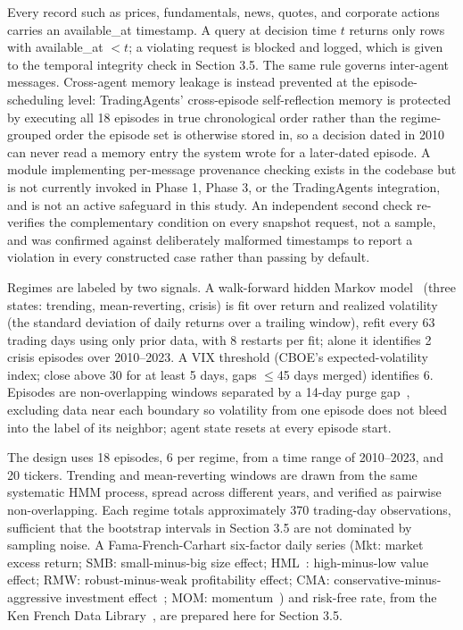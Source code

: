 \documentclass{article}
\begin{document}
Every record such as prices, fundamentals, news, quotes, and corporate actions carries an available\_at timestamp. A query at decision time $t$ returns only rows with available\_at $< t$; a violating request is blocked and logged, which is given to the temporal integrity check in Section 3.5. The same rule governs inter-agent messages. Cross-agent memory leakage is instead prevented at the episode-scheduling level: TradingAgents' cross-episode self-reflection memory is protected by executing all 18 episodes in true chronological order rather than the regime-grouped order the episode set is otherwise stored in, so a decision dated in 2010 can never read a memory entry the system wrote for a later-dated episode. A module implementing per-message provenance checking exists in the codebase but is not currently invoked in Phase 1, Phase 3, or the TradingAgents integration, and is not an active safeguard in this study. An independent second check re-verifies the complementary condition on every snapshot request, not a sample, and was confirmed against deliberately malformed timestamps to report a violation in every constructed case rather than passing by default.

Regimes are labeled by two signals. A walk-forward hidden Markov model~\cite{hamilton1989} (three states: trending, mean-reverting, crisis) is fit over return and realized volatility (the standard deviation of daily returns over a trailing window), refit every 63 trading days using only prior data, with 8 restarts per fit; alone it identifies 2 crisis episodes over 2010--2023. A VIX threshold (CBOE's expected-volatility index; close above 30 for at least 5 days, gaps $\leq$45 days merged) identifies 6. Episodes are non-overlapping windows separated by a 14-day purge gap~\cite{lopezdeprado2018}, excluding data near each boundary so volatility from one episode does not bleed into the label of its neighbor; agent state resets at every episode start.

The design uses 18 episodes, 6 per regime, from a time range of 2010--2023, and 20 tickers. Trending and mean-reverting windows are drawn from the same systematic HMM process, spread across different years, and verified as pairwise non-overlapping. Each regime totals approximately 370 trading-day observations, sufficient that the bootstrap intervals in Section 3.5 are not dominated by sampling noise. A Fama-French-Carhart six-factor daily series (Mkt: market excess return; SMB: small-minus-big size effect; HML~\cite{fama1993}: high-minus-low value effect; RMW: robust-minus-weak profitability effect; CMA: conservative-minus-aggressive investment effect~\cite{fama2015}; MOM: momentum~\cite{carhart1997}) and risk-free rate, from the Ken French Data Library~\cite{frenchlib}, are prepared here for Section 3.5.
\end{document}
